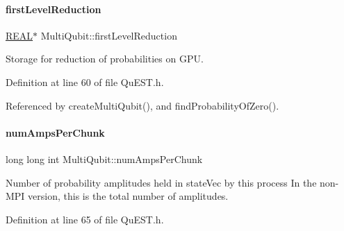 \mbox{\label{structMultiQubit_a4e0088b41adab0a40b7a31e528ed42b5}} 
\paragraph{\texorpdfstring{first\+Level\+Reduction}{firstLevelReduction}}
{\footnotesize\ttfamily \mbox{\hyperlink{QuEST__precision_8h_a4b654506f18b8bfd61ad2a29a7e38c25}{R\+E\+AL}}$\ast$ Multi\+Qubit\+::first\+Level\+Reduction}



Storage for reduction of probabilities on G\+PU. 



Definition at line 60 of file Qu\+E\+S\+T.\+h.



Referenced by create\+Multi\+Qubit(), and find\+Probability\+Of\+Zero().

\mbox{\label{structMultiQubit_a1cad83601a78635dd278259c7ed54f18}} 
\paragraph{\texorpdfstring{num\+Amps\+Per\+Chunk}{numAmpsPerChunk}}
{\footnotesize\ttfamily long long int Multi\+Qubit\+::num\+Amps\+Per\+Chunk}



Number of probability amplitudes held in state\+Vec by this process In the non-\/\+M\+PI version, this is the total number of amplitudes. 



Definition at line 65 of file Qu\+E\+S\+T.\+h.



